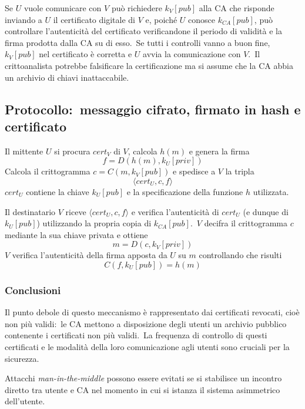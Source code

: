 \noindent Se $U$ vuole comunicare con $V$ può richiedere $k_V[\mathit{pub}]$ alla CA che risponde inviando a $U$ il certificato digitale di $V$ e, poiché $U$ conosce $k_{CA}[\mathit{pub}]$, può controllare l'autenticità del certificato verificandone il periodo di validità e la firma prodotta dalla CA su di esso.\
Se tutti i controlli vanno a buon fine, $k_V[\mathit{pub}]$ nel certificato è corretta e $U$ avvia la comunicazione con $V$.\
Il crittoanalista potrebbe falsificare la certificazione ma si assume che la CA abbia un archivio di chiavi inattaccabile.

\subsection{Protocollo:\ messaggio cifrato, firmato in hash e certificato}

Il mittente $U$ si procura $\mathit{cert}_V$ di $V$, calcola $h(m)$ e genera la firma
\[f = D(h(m), k_U[\mathit{priv}])\]
Calcola il crittogramma $c = C(m, k_V[\mathit{pub}])$ e spedisce a $V$ la tripla
\[\langle \mathit{cert}_U, c, f\rangle\]
$\mathit{cert}_U$ contiene la chiave $k_U[\mathit{pub}]$ e la specificazione della funzione $h$ utilizzata.

Il destinatario $V$ riceve $\langle \mathit{cert}_U, c, f\rangle$ e verifica l'autenticità di $\mathit{cert}_U$ (e dunque di $k_U[\mathit{pub}]$) utilizzando la propria copia di $k_{CA}[\mathit{pub}]$.\
$V$ decifra il crittogramma $c$ mediante la sua chiave privata e ottiene
\[m = D(c, k_V[\mathit{priv}])\]
$V$ verifica l'autenticità della firma apposta da $U$ su $m$ controllando che risulti
\[C(f, k_U[\mathit{pub}]) = h(m)\]

\subsubsection{Conclusioni}

Il punto debole di questo meccanismo è rappresentato dai certificati revocati, cioè non più validi:\ le CA mettono a disposizione degli utenti un archivio pubblico contenente i certificati non più validi.\
La frequenza di controllo di questi certificati e le modalità della loro comunicazione agli utenti sono cruciali per la sicurezza.\

Attacchi \textit{man-in-the-middle} possono essere evitati se si stabilisce un incontro diretto tra utente e CA nel momento in cui si istanza il sistema asimmetrico dell'utente.
